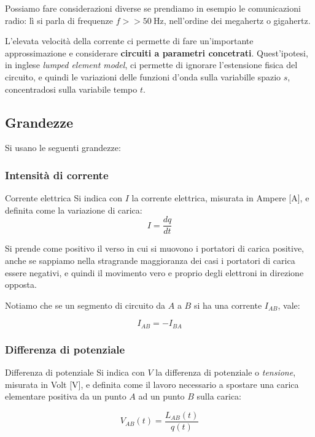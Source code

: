 \documentclass[a4paper,11pt]{article}
\begin{document}
Possiamo fare considerazioni diverse se prendiamo in esempio le comunicazioni radio: lì si parla di frequenze $f >> 50 \ \text{Hz}$, nell'ordine dei megahertz o gigahertz.

L'elevata velocità della corrente ci permette di fare un'importante approssimazione e considerare \textbf{circuiti a parametri concetrati}.
Quest'ipotesi, in inglese \textit{lumped element model}, ci permette di ignorare l'estensione fisica del circuito, e quindi le variazioni delle funzioni d'onda sulla variabille spazio $s$, concentradosi sulla variabile tempo $t$.

\subsection{Grandezze}
Si usano le seguenti grandezze:
\subsubsection{Intensità di corrente}

\begin{definition}{Corrente elettrica}	
Si indica con $I$ la corrente elettrica, misurata in Ampere [$\mathrm{A}$], e definita come la variazione di carica:
$$
I = \frac{dq}{dt}
$$
\end{definition}

Si prende come positivo il verso in cui si muovono i portatori di carica positive, anche se sappiamo nella stragrande maggioranza dei casi i portatori di carica essere negativi, e quindi il movimento vero e proprio degli elettroni in direzione opposta.

Notiamo che se un segmento di circuito da $A$ a $B$ si ha una corrente $I_{AB}$, vale:

$$
I_{AB} = -I_{BA}
$$

\subsubsection{Differenza di potenziale}

\begin{definition}{Differenza di potenziale}
Si indica con $V$ la differenza di potenziale o \textit{tensione}, misurata in Volt [$\mathrm{V}$], e definita come il lavoro necessario a spostare una carica elementare positiva da un punto $A$ ad un punto $B$ sulla carica:

$$
	V_{AB}(t) = \frac{L_{AB}(t)}{q(t)}
$$
\end{definition}
\end{document}
